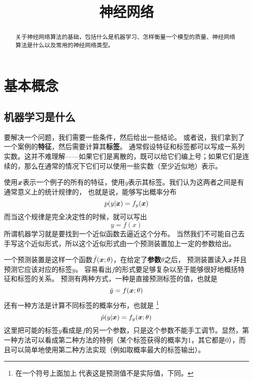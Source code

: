 \documentclass[UTF8, a4paper]{ctexart}
\title{神经网络}
\begin{document}
    
\maketitle

\begin{abstract}
    关于神经网络算法的基础，包括什么是机器学习、怎样衡量一个模型的质量、神经网络算法是什么以及常用的神经网络类型。
\end{abstract}

\hypertarget{sec:basic-concepts}{%
\section{基本概念}\label{sec:basic-concepts}}

\subsection{机器学习是什么}

要解决一个问题，我们需要一些条件，然后给出一些结论。
或者说，我们拿到了一个案例的\textbf{特征}，然后需要计算其\textbf{标签}。
通常假设特征和标签都可以写成一系列实数。这并不难理解——如果它们是离散的，既可以给它们编上号；如果它们是连续的，那么在通常的情况下它们可以使用一些实数（至少近似地）表示。

使用$\vb*{x}$表示一个例子的所有的特征，使用$y$表示其标签。我们认为这两者之间是有通常意义上的统计规律的，
也就是说，能够写出概率分布
\begin{equation}
    p(y|\vb*{x}) = f_y(\vb*{x})
    \label{eq:probablistic-distribution}
\end{equation}
而当这个规律是完全决定性的时候，就可以写出
\begin{equation}
    y = f(x)
    \label{eq:determined-distribution}
\end{equation}
所谓机器学习就是要找到一个近似函数去逼近这个分布。
当然我们不可能自己去手写这个近似形式，所以这个近似形式由一个预测装置加上一定的参数给出。

一个预测装置是这样一个函数$\hat{f}(\vb*{x};\theta)$，在给定了\textbf{参数}$\theta$之后，
预测装置读入$\vb*{x}$并且预测它应该对应的标签$y$。
容易看出$f$的形式要足够复杂以至于能够很好地概括特征和标签的关系。
预测有两种方式，一种是直接预测标签的值，也就是
\[
\hat{y} = f(\vb*{x};\theta)
\] 
还有一种方法是计算不同标签的概率分布，也就是%
\footnote{在一个符号上面加上$\hat{\;}$代表这是预测值不是实际值，下同。}
\[
\hat{p}(y|\vb*{x}) = f_y (\vb*{x};\theta)
\]
这里把可能的标签$y$看成是$f$的另一个参数，只是这个参数不能手工调节。显然，第一种方法可以看成第二种方法的特例（某个标签获得的概率为1，其它都是0），而且可以简单地使用第二种方法实现（例如取概率最大的标签输出）。
\end{document}
